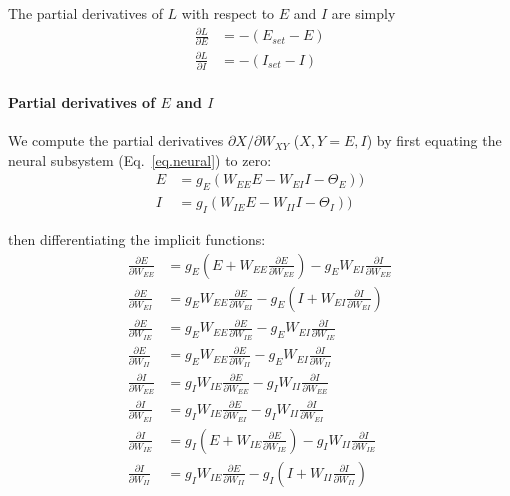 \documentclass[
twocolumn,
]{article}
\newcommand{\EE}{\mathit{EE}}
\newcommand{\EI}{\mathit{EI}}
\newcommand{\IE}{\mathit{IE}}
\newcommand{\II}{\mathit{II}}
\newcommand{\XY}{\mathit{XY}}
\newcommand{\set}{\mathit{set}}
\begin{document}
The partial derivatives of $L$ with respect to $E$ and $I$ are simply
\begin{equation}
\begin{aligned}
\frac{\partial L}{\partial E} & = - (E_{\set} - E) \\
\frac{\partial L}{\partial I} & = - (I_{\set} - I)
\end{aligned}
\label{eq.LF_dLdEI}
\end{equation}



\paragraph{Partial derivatives of $E$ and $I$}

We compute the partial derivatives $\partial X/\partial W_{\XY}$ ($X,Y = E,I$) by first equating the neural subsystem (Eq.\ \ref{eq.neural}) to zero:
\begin{equation}
\begin{aligned}
E & = g_E(W_{\EE}E - W_{\EI}I - \Theta_E)) \\
I & = g_I(W_{\IE}E - W_{\II}I - \Theta_I))
\end{aligned}
\label{eq.LF_implicit_functions}
\end{equation}

\noindent then differentiating the implicit functions:
\begin{equation}
\begin{aligned}
\frac{\partial E}{\partial W_{\EE}} & = g_E(E + W_{\EE} \frac{\partial E}{\partial W_{\EE}}) - g_E W_{\EI} \frac{\partial I}{\partial W_{\EE}} \\
\frac{\partial E}{\partial W_{\EI}} & = g_E W_{\EE} \frac{\partial E}{\partial W_{\EI}} - g_E (I + W_{\EI} \frac{\partial I}{\partial W_{\EI}}) \\
\frac{\partial E}{\partial W_{\IE}} & = g_E W_{\EE} \frac{\partial E}{\partial W_{\IE}} - g_E W_{\EI}\frac{\partial I}{\partial W_{\IE}} \\
\frac{\partial E}{\partial W_{\II}} & = g_E W_{\EE} \frac{\partial E}{\partial W_{\II}} - g_E W_{\EI} \frac{\partial I}{\partial W_{\II}} \\
\frac{\partial I}{\partial W_{\EE}} & = g_I W_{\IE} \frac{\partial E}{\partial W_{\EE}} - g_I W_{\II} \frac{\partial I}{\partial W_{\EE}} \\
\frac{\partial I}{\partial W_{\EI}} & = g_I W_{\IE} \frac{\partial E}{\partial W_{\EI}} - g_I W_{\II} \frac{\partial I}{\partial W_{\EI}} \\
\frac{\partial I}{\partial W_{\IE}} & = g_I (E + W_{\IE} \frac{\partial E}{\partial W_{\IE}}) - g_I W_{\II} \frac{\partial I}{\partial W_{\IE}} \\
\frac{\partial I}{\partial W_{\II}} & = g_I W_{\IE} \frac{\partial E}{\partial W_{\II}} - g_I (I + W_{\II} \frac{\partial I}{\partial W_{\II}})
\end{aligned}
\label{eq.LF_implicit_derivs}
\end{equation}
\end{document}
